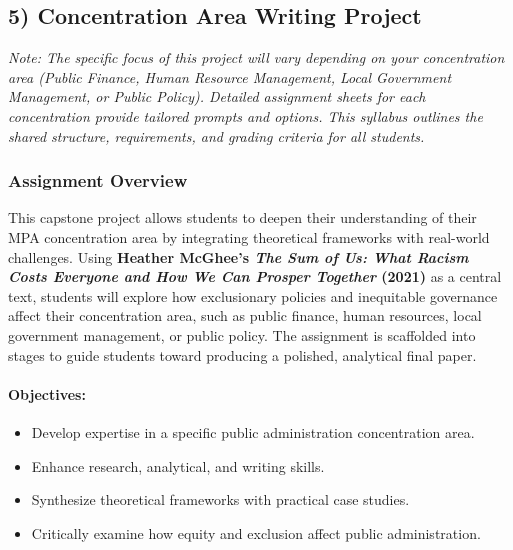 \documentclass[12pt, letterpaper]{article}
\begin{document}
\subsection*{5) Concentration Area Writing Project}

\noindent \textit{Note: The specific focus of this project will vary depending on your concentration area (Public Finance, Human Resource Management, Local Government Management, or Public Policy). Detailed assignment sheets for each concentration provide tailored prompts and options. This syllabus outlines the shared structure, requirements, and grading criteria for all students.}

\subsubsection*{Assignment Overview}

This capstone project allows students to deepen their understanding of their MPA concentration area by integrating theoretical frameworks with real-world challenges. Using \textbf{Heather McGhee's \textit{The Sum of Us: What Racism Costs Everyone and How We Can Prosper Together} (2021)} as a central text, students will explore how exclusionary policies and inequitable governance affect their concentration area, such as public finance, human resources, local government management, or public policy. The assignment is scaffolded into stages to guide students toward producing a polished, analytical final paper.

\paragraph*{Objectives:}
\begin{itemize}
    \item Develop expertise in a specific public administration concentration area.
    \item Enhance research, analytical, and writing skills.
    \item Synthesize theoretical frameworks with practical case studies.
    \item Critically examine how equity and exclusion affect public administration.
\end{itemize}
\end{document}
